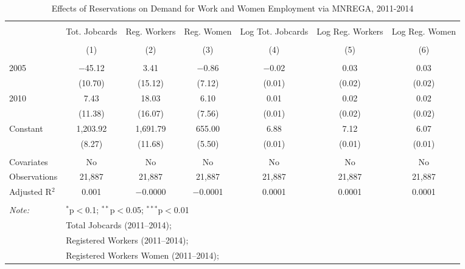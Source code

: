
\begin{sidewaystable}[!htbp] \centering 
  \caption{Effects of Reservations on Demand for Work and Women Employment via MNREGA, 2011-2014} 
  \label{mnrega_main_up} 
\scriptsize 
\begin{tabular}{@{\extracolsep{0pt}}lcccccc} 
\\[-1.8ex]\hline 
\hline \\[-1.8ex] 
 & Tot. Jobcards & Reg. Workers & Reg. Women & Log Tot. Jobcards & Log Reg. Workers & Log Reg. Women \\ 
\\[-1.8ex] & (1) & (2) & (3) & (4) & (5) & (6)\\ 
\hline \\[-1.8ex] 
 2005 & $-$45.12 & 3.41 & $-$0.86 & $-$0.02 & 0.03 & 0.03 \\ 
  & (10.70) & (15.12) & (7.12) & (0.01) & (0.02) & (0.02) \\ 
  2010 & 7.43 & 18.03 & 6.10 & 0.01 & 0.02 & 0.02 \\ 
  & (11.38) & (16.07) & (7.56) & (0.01) & (0.02) & (0.02) \\ 
  Constant & 1,203.92 & 1,691.79 & 655.00 & 6.88 & 7.12 & 6.07 \\ 
  & (8.27) & (11.68) & (5.50) & (0.01) & (0.01) & (0.01) \\ 
 \hline \\[-1.8ex] 
Covariates & No & No & No & No & No & No \\ 
Observations & 21,887 & 21,887 & 21,887 & 21,887 & 21,887 & 21,887 \\ 
Adjusted R$^{2}$ & 0.001 & $-$0.0000 & $-$0.0001 & 0.0001 & 0.0001 & 0.0001 \\ 
\hline 
\hline \\[-1.8ex] 
\textit{Note:}  & \multicolumn{6}{l}{$^{*}$p$<$0.1; $^{**}$p$<$0.05; $^{***}$p$<$0.01} \\ 
 & \multicolumn{6}{l}{Total Jobcards (2011--2014);} \\ 
 & \multicolumn{6}{l}{Registered Workers (2011--2014);} \\ 
 & \multicolumn{6}{l}{Registered Workers Women  (2011--2014);} \\ 
\end{tabular} 
\end{sidewaystable} 
